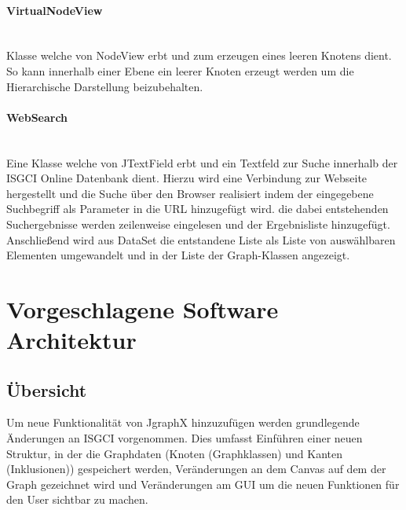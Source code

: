 \documentclass[10pt,a4paper]{article}
\begin{document}
\paragraph{VirtualNodeView}\ \\Klasse welche von NodeView erbt und zum erzeugen eines leeren Knotens dient. So kann innerhalb einer Ebene ein leerer Knoten erzeugt werden um die Hierarchische Darstellung beizubehalten.

\paragraph{WebSearch}\ \\Eine Klasse welche von JTextField erbt und ein Textfeld zur Suche innerhalb der ISGCI Online Datenbank dient. Hierzu wird eine Verbindung zur Webseite hergestellt und die Suche über den Browser realisiert indem der eingegebene Suchbegriff als Parameter in die URL hinzugefügt wird. die dabei entstehenden Suchergebnisse werden zeilenweise eingelesen und der Ergebnisliste hinzugefügt. Anschließend wird aus DataSet die entstandene Liste als Liste von auswählbaren Elementen umgewandelt und in der Liste der Graph-Klassen angezeigt. 


\newpage
\section{Vorgeschlagene Software Architektur}
\subsection{Übersicht}
Um neue Funktionalität von JgraphX hinzuzufügen werden grundlegende Änderungen an ISGCI vorgenommen. Dies umfasst Einführen einer neuen Struktur, in der die Graphdaten (Knoten (Graphklassen) und Kanten (Inklusionen)) gespeichert werden, Veränderungen an dem Canvas auf dem der Graph gezeichnet wird und Veränderungen am GUI um die neuen Funktionen für den User sichtbar zu machen.
\end{document}
